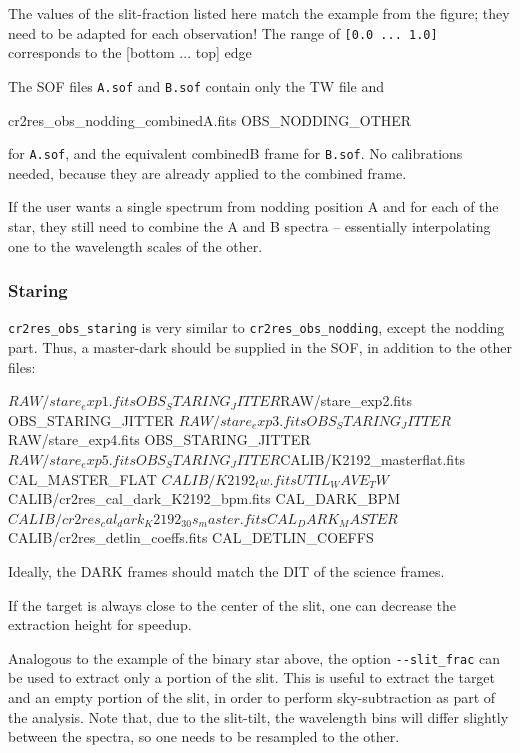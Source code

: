 The values of the slit-fraction listed here match the example from the figure;
they need to be adapted for each observation! The range of \verb![0.0 ... 1.0]!
corresponds to the [bottom ... top] edge 

The SOF files \verb!A.sof! and \verb!B.sof! contain only the TW file and
\begin{shell}[fontsize=\small]
    cr2res_obs_nodding_combinedA.fits OBS_NODDING_OTHER
\end{shell}
for \verb!A.sof!, and the equivalent combinedB frame for \verb!B.sof!.
No calibrations needed, because they are already applied to the combined frame.

If the user wants a single spectrum from nodding position A and for each of the
star, they still need to combine the A and B spectra -- essentially interpolating
one to the wavelength scales of the other.


\subsubsection{Staring}

\verb!cr2res_obs_staring! is very similar to \verb!cr2res_obs_nodding!, except
the nodding part. Thus, a master-dark should be supplied in the SOF, in addition
to the other files:
\begin{shell}[fontsize=\small]
$RAW/stare_exp1.fits        OBS_STARING_JITTER
$RAW/stare_exp2.fits        OBS_STARING_JITTER
$RAW/stare_exp3.fits        OBS_STARING_JITTER
$RAW/stare_exp4.fits        OBS_STARING_JITTER
$RAW/stare_exp5.fits        OBS_STARING_JITTER
$CALIB/K2192_masterflat.fits                  CAL_MASTER_FLAT
$CALIB/K2192_tw.fits                          UTIL_WAVE_TW
$CALIB/cr2res_cal_dark_K2192_bpm.fits         CAL_DARK_BPM
$CALIB/cr2res_cal_dark_K2192_30s_master.fits  CAL_DARK_MASTER
$CALIB/cr2res_detlin_coeffs.fits              CAL_DETLIN_COEFFS
\end{shell}  
Ideally, the DARK frames should match the DIT of the science frames.

If the target is always close to the center of the slit, one can decrease the extraction height for speedup.
\begin{shell}[fontsize=\small]
\end{shell}  

Analogous to the example of the binary star above, the option \verb!--slit_frac!
can be used to extract only a portion of the slit. This is useful to extract the
target and an empty portion of the slit, in order to perform sky-subtraction as
part of the analysis. Note that, due to the slit-tilt, the wavelength bins will
differ slightly between the spectra, so one needs to be resampled to the other.

